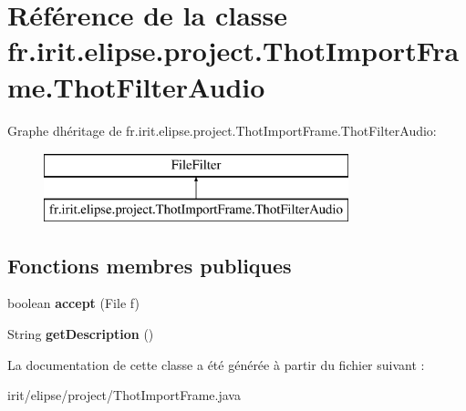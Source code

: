 \hypertarget{classfr_1_1irit_1_1elipse_1_1project_1_1_thot_import_frame_1_1_thot_filter_audio}{}\section{Référence de la classe fr.\+irit.\+elipse.\+project.\+Thot\+Import\+Frame.\+Thot\+Filter\+Audio}
\label{classfr_1_1irit_1_1elipse_1_1project_1_1_thot_import_frame_1_1_thot_filter_audio}
Graphe d\textquotesingle{}héritage de fr.\+irit.\+elipse.\+project.\+Thot\+Import\+Frame.\+Thot\+Filter\+Audio\+:\begin{figure}[H]
\begin{center}
\leavevmode
\includegraphics[height=2.000000cm]{classfr_1_1irit_1_1elipse_1_1project_1_1_thot_import_frame_1_1_thot_filter_audio}
\end{center}
\end{figure}
\subsection*{Fonctions membres publiques}
\begin{DoxyCompactItemize}
\item 
\mbox{\label{classfr_1_1irit_1_1elipse_1_1project_1_1_thot_import_frame_1_1_thot_filter_audio_a7fe83041aa625c835dfd02a0ed0cbb6f}} 
boolean {\bfseries accept} (File f)
\item 
\mbox{\label{classfr_1_1irit_1_1elipse_1_1project_1_1_thot_import_frame_1_1_thot_filter_audio_a3ff3a8e663a41d4cb4e45b672e8508a0}} 
String {\bfseries get\+Description} ()
\end{DoxyCompactItemize}


La documentation de cette classe a été générée à partir du fichier suivant \+:\begin{DoxyCompactItemize}
\item 
irit/elipse/project/Thot\+Import\+Frame.\+java\end{DoxyCompactItemize}
